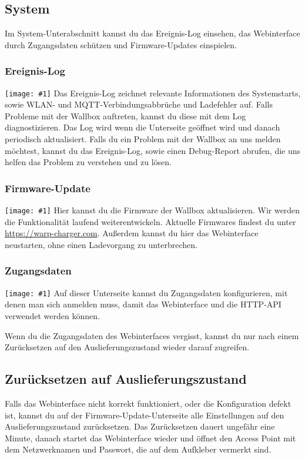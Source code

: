 \documentclass[a4paper,10pt]{article}
\newcommand{\hint}[1]{\begin{tcolorbox}[colback=boxgray,colframe=black,coltext=
white,title=Hinweis]#1\end{tcolorbox}}
\newcommand{\gfx}[1]{\texttt{[image: \#1]}}
\begin{document}
\begin{multicols*}{2}
	\subsection{System}
	Im System-Unterabschnitt kannst du das Ereignis-Log einsehen, das Webinterface durch Zugangsdaten schützen und Firmware-Updates einspielen.
	\subsubsection{Ereignis-Log}
	\gfx{./img/resized/web_event_log}
	Das Ereignis-Log zeichnet relevante Informationen des Systemstarts, sowie WLAN- und MQTT-Verbindungsabbrüche und Ladefehler auf.
	Falls Probleme mit der Wallbox auftreten, kannst du diese mit dem Log diagnostizieren.
	Das Log wird wenn die Unterseite geöffnet wird und danach periodisch aktualisiert.
	Falls du ein Problem mit der Wallbox an uns melden möchtest, kannst du das Ereignis-Log,
	sowie einen Debug-Report abrufen, die uns helfen das Problem zu verstehen und zu lösen.

	\subsubsection{Firmware-Update}
	\gfx{./img/resized/web_firmware_update}
	Hier kannst du die Firmware der Wallbox aktualisieren. Wir werden die Funktionalität
	laufend weiterentwickeln. Aktuelle Firmwares findest du unter \url{https://warp-charger.com}.
	Außerdem kannst du hier das Webinterface neustarten, ohne einen Ladevorgang zu unterbrechen.

	\subsubsection{Zugangsdaten}
	\gfx{./img/resized/web_authentication}
	Auf dieser Unterseite kannst du Zugangsdaten konfigurieren, mit denen man sich anmelden muss,
	damit das Webinterface und die HTTP-API verwendet werden können.
	\hint{Wenn du die Zugangsdaten des Webinterfaces vergisst, kannst du nur nach einem Zurücksetzen
	auf den Auslieferungszustand wieder darauf zugreifen.}

	\subsection{Zurücksetzen auf Auslieferungszustand}\label{reset}
	Falls das Webinterface nicht korrekt funktioniert, oder die Konfiguration defekt ist,
	kannst du auf der Firmware-Update-Unterseite alle Einstellungen auf den Auslieferungszustand zurücksetzen.
	Das Zurücksetzen dauert ungefähr eine Minute, danach startet das Webinterface wieder und öffnet
	den Access Point mit dem Netzwerknamen und Passwort, die auf dem Aufkleber vermerkt sind.


\end{multicols*}
\end{document}
